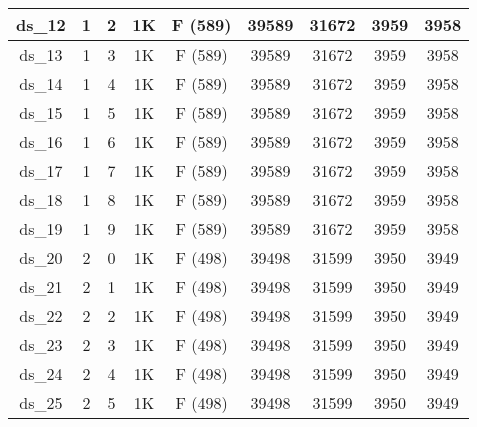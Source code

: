 \begin{footnotesize}
\begin{longtable}{|c|c|c|c|c|c|c|c|c|}
ds\_12      & 1           & 2           & 1K        & F (589)                     & 39589         & 31672          & 3959           & 3958          \\ \hline
ds\_13      & 1           & 3           & 1K        & F (589)                     & 39589         & 31672          & 3959           & 3958          \\ \hline
ds\_14      & 1           & 4           & 1K        & F (589)                     & 39589         & 31672          & 3959           & 3958          \\ \hline
ds\_15      & 1           & 5           & 1K        & F (589)                     & 39589         & 31672          & 3959           & 3958          \\ \hline
ds\_16      & 1           & 6           & 1K        & F (589)                     & 39589         & 31672          & 3959           & 3958          \\ \hline
ds\_17      & 1           & 7           & 1K        & F (589)                     & 39589         & 31672          & 3959           & 3958          \\ \hline
ds\_18      & 1           & 8           & 1K        & F (589)                     & 39589         & 31672          & 3959           & 3958          \\ \hline
ds\_19      & 1           & 9           & 1K        & F (589)                     & 39589         & 31672          & 3959           & 3958          \\ \hline
ds\_20      & 2           & 0           & 1K        & F (498)                     & 39498         & 31599          & 3950           & 3949          \\ \hline
ds\_21      & 2           & 1           & 1K        & F (498)                     & 39498         & 31599          & 3950           & 3949          \\ \hline
ds\_22      & 2           & 2           & 1K        & F (498)                     & 39498         & 31599          & 3950           & 3949          \\ \hline
ds\_23      & 2           & 3           & 1K        & F (498)                     & 39498         & 31599          & 3950           & 3949          \\ \hline
ds\_24      & 2           & 4           & 1K        & F (498)                     & 39498         & 31599          & 3950           & 3949          \\ \hline
ds\_25      & 2           & 5           & 1K        & F (498)                     & 39498         & 31599          & 3950           & 3949          \\ \hline

\end{longtable}
\end{footnotesize}
